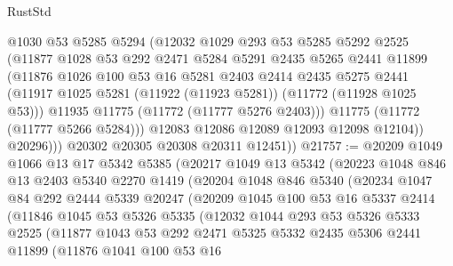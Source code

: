 \begin{lexlean}{RustStd}
\begin{coremodule}
                @1030
                @53
                @5285
                @5294
                (@12032
                  @1029
                  @293
                  @53
                  @5285
                  @5292
                  @2525
                  (@11877
                    @1028
                    @53
                    @292
                    @2471
                    @5284
                    @5291
                    @2435
                    @5265
                    @2441
                    @11899
                    (@11876
                      @1026
                      @100
                      @53
                      @16
                      @5281
                      @2403
                      @2414
                      @2435
                      @5275
                      @2441
                      (@11917 @1025 @5281 (@11922 (@11923 @5281)) (@11772 (@11928 @1025 @53)))
                      @11935
                      @11775
                      (@11772 (@11777 @5276 @2403)))
                    @11775
                    (@11772 (@11777 @5266 @5284)))
                  @12083
                  @12086
                  @12089
                  @12093
                  @12098
                  @12104))
              @20296)))
        @20302
        @20305
        @20308
        @20311
        @12451))
@21757 := @20209
    @1049
    @1066
    @13
    @17
    @5342
    @5385
    (@20217
      @1049
      @13
      @5342
      (@20223
        @1048
        @846
        @13
        @2403
        @5340
        @2270
        @1419
        (@20204
          @1048
          @846
          @5340
          (@20234
            @1047
            @84
            @292
            @2444
            @5339
            @20247
            (@20209
              @1045
              @100
              @53
              @16
              @5337
              @2414
              (@11846
                @1045
                @53
                @5326
                @5335
                (@12032
                  @1044
                  @293
                  @53
                  @5326
                  @5333
                  @2525
                  (@11877
                    @1043
                    @53
                    @292
                    @2471
                    @5325
                    @5332
                    @2435
                    @5306
                    @2441
                    @11899
                    (@11876
                      @1041
                      @100
                      @53
                      @16

\end{coremodule}
\end{lexlean}
